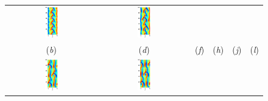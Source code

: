 \begin{figure}[t]
\begin{center}
\begin{tabular}{cccccc}
\includegraphics[width=0.15\textwidth, clip=true]{figs/ks22rpo020.5-00.00.eps}\hspace{-3ex} &
\includegraphics[width=0.15\textwidth, clip=true]{figs/ks22rpo066.8-00.00.eps}\\
(\textit{b}) & (\textit{d}) & (\textit{f}) &
(\textit{h}) & (\textit{j}) & (\textit{l})\\
\includegraphics[width=0.15\textwidth, clip=true]{figs/ks22rpo032.8-10.96.eps}\hspace{-3ex} &
\includegraphics[width=0.15\textwidth, clip=true]{figs/ks22rpo034.6-09.60.eps}\hspace{-3ex} &

\end{tabular}
\end{center}
\end{figure}
